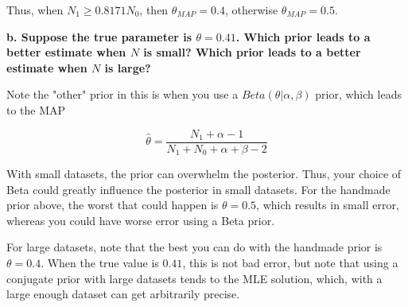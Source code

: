 {Thus, when $N_1 \geq 0.8171 N_0$, then $\theta_{MAP} = 0.4$, otherwise
$\theta_{MAP} = 0.5$.

\textbf{b. Suppose the true parameter is $\theta = 0.41$. Which prior leads
to a better estimate when $N$ is small? Which prior leads to a better estimate
when $N$ is large?}

Note the "other" prior in this is when you use a $Beta(\theta|\alpha,\beta)$
prior, which leads to the MAP

$$\hat{\theta} = \frac{N_1+\alpha-1}{N_1+N_0+\alpha+\beta-2}$$

With small datasets, the prior can overwhelm the posterior. Thus, your choice
of Beta could greatly influence the posterior in small datasets. For the
handmade prior above, the worst that could happen is $\theta=0.5$, which
results in small error, whereas you could have worse error using a Beta prior.

For large datasets, note that the best you can do with the handmade prior is
$\theta=0.4$. When the true value is $0.41$, this is not bad error, but note
that using a conjugate prior with large datasets tends to the MLE solution,
which, with a large enough dataset can get arbitrarily precise.

}


